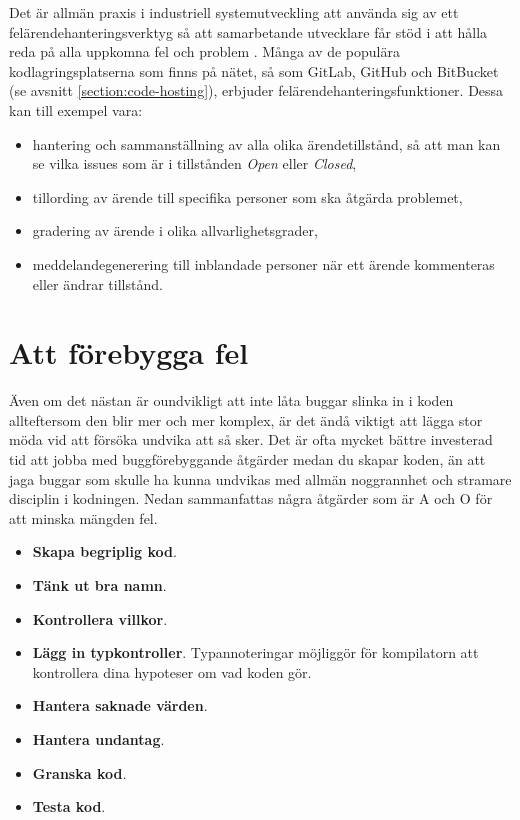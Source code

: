 Det är allmän praxis i industriell systemutveckling att använda sig av ett felärendehanteringsverktyg  så att samarbetande utvecklare får stöd i att hålla reda på alla uppkomna fel och problem . Många av de populära kodlagringsplatserna som finns på nätet, så som GitLab, GitHub och BitBucket (se avsnitt \ref{section:code-hosting}), erbjuder felärendehanteringsfunktioner. Dessa kan till exempel vara:
\begin{itemize}
\item hantering och sammanställning av alla olika ärendetillstånd, så att man kan se vilka issues som är i tillstånden \textit{Open} eller \textit{Closed},
\item tillording av ärende till specifika personer som ska åtgärda problemet,
\item gradering av ärende i olika allvarlighetsgrader,
\item meddelandegenerering till inblandade personer när ett ärende kommenteras eller ändrar tillstånd.
\end{itemize}


\section{Att förebygga fel}

Även om det nästan är oundvikligt att inte låta buggar slinka in i koden allteftersom den blir mer och mer komplex, är det ändå viktigt att lägga stor möda vid att försöka undvika att så sker. Det är ofta mycket bättre investerad tid att jobba med buggförebyggande åtgärder medan du skapar koden, än att jaga buggar som skulle ha kunna undvikas med allmän noggrannhet och stramare disciplin i kodningen. Nedan sammanfattas några åtgärder som är A och O för att minska mängden fel.

\begin{itemize}
\item \textbf{Skapa begriplig kod}. 
\item \textbf{Tänk ut bra namn}.
\item \textbf{Kontrollera villkor}.
\item \textbf{Lägg in typkontroller}. Typannoteringar möjliggör för kompilatorn att kontrollera dina hypoteser om vad koden gör.
\item \textbf{Hantera saknade värden}.
\item \textbf{Hantera undantag}.
\item \textbf{Granska kod}.
\item \textbf{Testa kod}.
\end{itemize}


